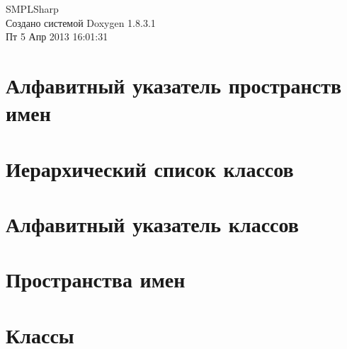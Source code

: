 \documentclass{book}
\begin{document}
\hypersetup{pageanchor=false,citecolor=blue}
\begin{titlepage}
\vspace*{7cm}
\begin{center}
{\Large S\-M\-P\-L\-Sharp }\\
\vspace*{1cm}
{\large Создано системой Doxygen 1.8.3.1}\\
\vspace*{0.5cm}
{\small Пт 5 Апр 2013 16:01:31}\\
\end{center}
\end{titlepage}
\clearemptydoublepage
{}
\tableofcontents
\clearemptydoublepage
{}
\hypersetup{pageanchor=true,citecolor=blue}
\chapter{Алфавитный указатель пространств имен}

\chapter{Иерархический список классов}

\chapter{Алфавитный указатель классов}

\chapter{Пространства имен}



\chapter{Классы}













\printindex
\end{document}

